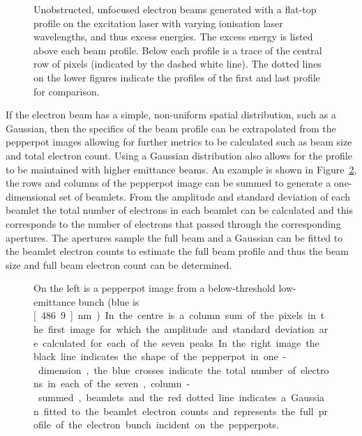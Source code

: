 \begin{figure}
    \center
    
    \caption[Blurring of flat-top electron profile with emittance.]{Unobstructed, unfocused electron beams generated with a flat-top profile on the excitation laser with varying ionisation laser wavelengths, and thus excess energies. The excess energy is listed above each beam profile. Below each profile is a trace of the central row of pixels (indicated by the dashed white line). The dotted lines on the lower figures indicate the profiles of the first and last profile for comparison.}
    \label{figure:flat_top}
\end{figure}

If the electron beam has a simple, non-uniform spatial distribution, such as a Gaussian, then the specifics of the beam profile can be extrapolated from the pepperpot images allowing for further metrics to be calculated such as beam size and total electron count.
Using a Gaussian distribution also allows for the profile to be maintained with higher emittance beams.
An example is shown in Figure~\ref{figure:pepperpot_profile}, the rows and columns of the pepperpot image can be summed to generate a one-dimensional set of beamlets.
From the amplitude and standard deviation of each beamlet the total number of electrons in each beamlet can be calculated and this corresponds to the number of electrons that passed through the corresponding apertures.
The apertures sample the full beam and a Gaussian can be fitted to the beamlet electron counts to estimate the full beam profile and thus the beam size and full beam electron count can be determined.

\begin{figure}
    \center
    
    \caption[Determining the beam profile from a pepperpot measurement.]{On the left is a pepperpot image from a below-threshold low-emittance bunch (blue is \unit[486.9]{nm}). In the centre is a column sum of the pixels in the first image for which the amplitude and standard deviation are calculated for each of the seven peaks. In the right image the black line indicates the shape of the pepperpot in one-dimension, the blue crosses indicate the total number of electrons in each of the seven, column-summed, beamlets and the red dotted line indicates a Gaussian fitted to the beamlet electron counts and represents the full profile of the electron bunch incident on the pepperpots.}
    \label{figure:pepperpot_profile}
\end{figure}

